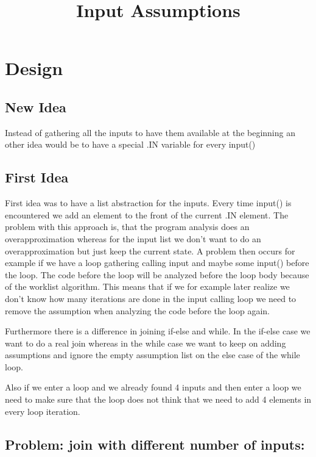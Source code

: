 \documentclass[11pt]{article}
\begin{document}
\title{Input Assumptions}

\maketitle


\section{Design}

\subsection{New Idea}

Instead of gathering all the inputs to have them available at the beginning an other idea would be to have a special .IN variable for every input()

\subsection{First Idea}

First idea was to have a list abstraction for the inputs. Every time input() is encountered we add an element to the front of the current .IN element. The problem with this approach is, that the program analysis does an overapproximation whereas for the input list we don't want to do an overapproximation but just keep the current state. A problem then occurs for example if we have a loop gathering calling input and maybe some input() before the loop. The code before the loop will be analyzed before the loop body because of the worklist algorithm. This means that if we for example later realize we don't know how many iterations are done in the input calling loop we need to remove the assumption when analyzing the code before the loop again. 

Furthermore there is a difference in joining if-else and while. In the if-else case we want to do a real join whereas in the while case we want to keep on adding assumptions and ignore the empty assumption list on the else case of the while loop. 

Also if we enter a loop and we already found 4 inputs and then enter a loop we need to make sure that the loop does not think that we need to add 4 elements in every loop iteration.

\subsection{Problem: join with different number of inputs:}
\end{document}
